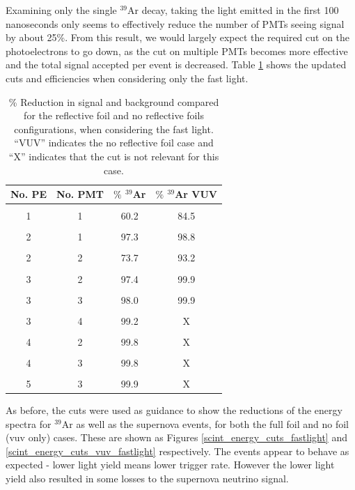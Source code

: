 \documentclass[a4paper]{article}
\begin{document}
Examining only the single $^{39}$Ar decay, taking the light emitted in the first 100 nanoseconds only seems to effectively reduce the number of PMTs seeing signal by about 25\%. From this result, we would largely expect the required cut on the photoelectrons to go down, as the cut on multiple PMTs becomes more effective and the total signal accepted per event is decreased. Table \ref{cuts_table_fastlight} shows the updated cuts and efficiencies when considering only the fast light.

\begin{table}[H]
	\begin{center}
	\begin{tabular}{| c | c || c | c ||}
	\hline
	No. PE & No. PMT & $\%$ $^{39}$Ar & $\%$ $^{39}$Ar VUV\\
	\hline
	 & & &\\
	 1 & 1 & 60.2  & 84.5\\
	 & & &\\
	 2 & 1 & 97.3 & 98.8\\
	 & & &\\
	 2 & 2 & 73.7 & 93.2\\
	  & & &\\
	 3 & 2 & 97.4 & 99.9\\
	 & & &\\
	 3 & 3 &  98.0 & 99.9\\
	 & & &\\
	 3 & 4 & 99.2 & X\\
	 & & &\\
	 4 & 2 & 99.8 & X\\
	 & & &\\
	 4 & 3 & 99.8 & X\\
	 & & &\\
	 5 & 3 & 99.9 & X\\
	\hline
	\end{tabular}
	\end{center}
	\caption{\% Reduction in signal and background compared for the reflective foil and no reflective foils configurations, when considering the fast light. ``VUV'' indicates the no reflective foil case and ``X'' indicates that the cut is not relevant for this case.}\label{cuts_table_fastlight}
	\end{table}
	
As before, the cuts were used as guidance to show the reductions of the energy spectra for $^{39}$Ar as well as the supernova events, for both the full foil and no foil (vuv only) cases. These are shown as Figures \ref{scint_energy_cuts_fastlight} and \ref{scint_energy_cuts_vuv_fastlight} respectively. The events appear to behave as expected - lower light yield means lower trigger rate. However the lower light yield also resulted in some losses to the supernova neutrino signal.
\end{document}
